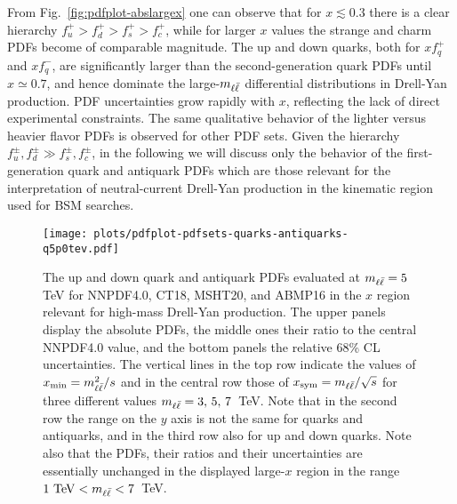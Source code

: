    From Fig.~\ref{fig:pdfplot-abslargex} one can observe that for
   $x\lesssim 0.3$ there is a clear hierarchy
$f_u^+>f_d^+ >f_s^+>f_c^+$, while for larger $x$ values the
   strange and charm PDFs become of comparable magnitude.
   The up and down quarks, both for $xf^+_q$ and $xf^-_q$, are significantly larger
   than the second-generation quark PDFs until $x\simeq 0.7$, and hence dominate the
   large-$m_{\ell\bar{\ell}}$ differential distributions in Drell-Yan production.
%
PDF uncertainties grow rapidly with $x$, reflecting the lack
of direct experimental constraints.
%
The same qualitative behavior of the lighter versus heavier flavor PDFs
is observed for other PDF sets.
%
Given the hierarchy $f_u^\pm, f_d^\pm \gg f_s^\pm, f_c^\pm $, in the following
we will discuss only the behavior of the first-generation quark
and antiquark PDFs which are those relevant for the interpretation
of neutral-current Drell-Yan production in the kinematic region used
for BSM searches. 
      


\begin{figure}[!t]
 \centering
 \texttt{[image: plots/pdfplot-pdfsets-quarks-antiquarks-q5p0tev.pdf]}
 \caption{\small The up and down quark and antiquark PDFs evaluated at $m_{\ell\bar{\ell}}=5$ TeV
   for NNPDF4.0, CT18, MSHT20, and ABMP16 in the $x$ region relevant for
   high-mass Drell-Yan production. The upper panels display the absolute PDFs,
   the middle ones their ratio to the central NNPDF4.0 value, and the bottom panels
   the relative 68\% CL uncertainties.
   The vertical lines in the top
   row indicate the values of  $x_{\rm min}=m_{\ell\bar{\ell}}^2/s$ and in the central
   row those of $x_{\rm  sym}=m_{\ell\bar{\ell}}/\sqrt{s}$
   for three
   different values  $m_{\ell\bar{\ell}}=3,\,5,\,7$~TeV.
   Note that in the second row the
   range on the $y$ axis is not the same for quarks and antiquarks,
   and in the third row also for up and down quarks.
   Note also that the
   PDFs, their ratios and their uncertainties are essentially
   unchanged in the displayed large-$x$ region in the range $1~{\rm TeV}<m_{\ell\bar{\ell}}<7$~TeV.
}    
 \label{fig:mll_dep_pdfs}
\end{figure}

